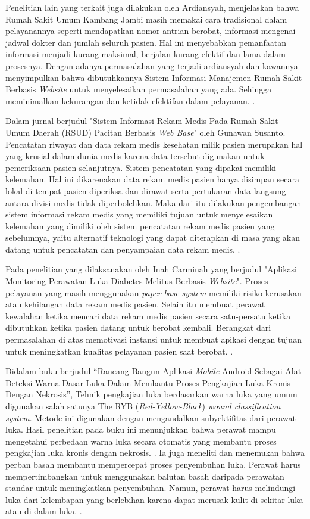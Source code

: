 Penelitian lain yang terkait juga dilakukan oleh Ardiansyah, menjelaskan bahwa Rumah Sakit Umum Kambang Jambi masih memakai cara tradisional dalam pelayanannya seperti mendapatkan nomor antrian berobat, informasi mengenai jadwal dokter dan jumlah seluruh pasien. Hal ini menyebabkan pemanfaatan informasi menjadi kurang maksimal, berjalan kurang efektif dan lama dalam prosesnya. Dengan adanya permasalahan yang terjadi ardiansyah dan kawannya menyimpulkan bahwa dibutuhkannya Sistem Informasi Manajemen Rumah Sakit Berbasis \emph{Website} untuk menyelesaikan permasalahan yang ada. Sehingga meminimalkan kekurangan dan ketidak efektifan dalam pelayanan. \citep{Ardiansyah2021analisis:10}.

Dalam jurnal berjudul "Sistem Informasi Rekam Medis Pada Rumah Sakit Umum Daerah (RSUD) Pacitan Berbasis \emph{Web Base}" oleh Gunawan Susanto. Pencatatan riwayat dan data rekam medis kesehatan milik pasien merupakan hal yang krusial dalam dunia medis karena data tersebut digunakan untuk pemeriksaan pasien selanjutnya. Sistem pencatatan yang dipakai memiliki kelemahan. Hal ini dikarenakan data rekam medis pasien hanya disimpan secara lokal di tempat pasien diperiksa dan dirawat serta pertukaran data langsung antara divisi medis tidak diperbolehkan. Maka dari itu dilakukan pengembangan sistem informasi rekam medis yang memiliki tujuan untuk menyelesaikan kelemahan yang dimiliki oleh sistem pencatatan rekam medis pasien yang sebelumnya, yaitu alternatif teknologi yang dapat diterapkan di masa yang akan datang untuk pencatatan dan penyampaian data rekam medis. \citep{Gunawan2011sistem:11}.

Pada penelitian yang dilaksanakan oleh Inah Carminah yang berjudul "Aplikasi Monitoring Perawatan Luka Diabetes Melitus Berbasis \emph{Website}". Proses pelayanan yang masih menggunakan \emph{paper base system} memiliki risiko kerusakan atau kehilangan data rekam medis pasien. Selain itu membuat perawat kewalahan ketika mencari data rekam medis pasien secara satu-persatu ketika dibutuhkan ketika pasien datang untuk berobat kembali. Berangkat dari permasalahan di atas memotivasi instansi untuk membuat apikasi dengan tujuan untuk meningkatkan kualitas pelayanan pasien saat berobat. \citep{Carminah2021aplikasi:12}.

%
Didalam buku berjudul “Rancang Bangun Aplikasi \emph{Mobile} Android Sebagai Alat Deteksi Warna Dasar Luka Dalam Membantu Proses Pengkajian Luka Kronis Dengan Nekrosis”, Tehnik pengkajian luka berdasarkan warna luka yang umum digunakan salah satunya The RYB (\emph{Red-Yellow-Black}) \emph{wound classification system}. Metode ini digunakan dengan mengandalkan subyektifitas dari perawat luka. Hasil penelitian pada buku ini menunjukkan bahwa perawat mampu mengetahui perbedaan warna luka secara otomatis yang membantu proses pengkajian luka kronis dengan nekrosis. \citep{Aryani2018rancang:6}. Ia juga meneliti dan menemukan bahwa perban basah membantu mempercepat proses penyembuhan luka. Perawat harus mempertimbangkan untuk menggunakan balutan basah daripada perawatan standar untuk meningkatkan penyembuhan. Namun, perawat harus melindungi luka dari kelembapan yang berlebihan karena dapat merusak kulit di sekitar luka atau di dalam luka. \citep{Aryani2016accelerating:7}.

